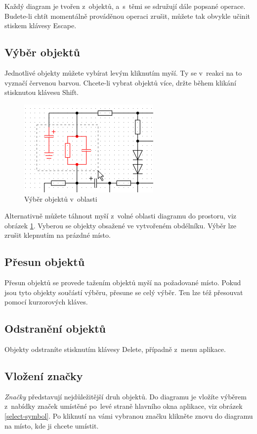 \documentclass[12pt,oneside,a4paper,titlepage,final]{article}
\theoremstyle{note}
\begin{document}
Každý diagram je tvořen z~objektů, a~s~těmi se sdružují dále popsané operace. Budete-li chtít momentálně prováděnou operaci zrušit, můžete tak obvykle učinit stiskem klávesy Escape.

\subsection{Výběr objektů}
Jednotlivé objekty můžete vybírat levým kliknutím myší. Ty se v~reakci na to vyznačí červenou barvou. Chcete-li vybrat objektů více, držte během klikání stisknutou klávesu Shift.

\begin{figure}[ht]
	\centering
	\includegraphics{select-objects}
	\caption{Výběr objektů v~oblasti}
	\label{select-objects}
\end{figure}

Alternativně můžete táhnout myší z~volné oblasti diagramu do prostoru, viz obrázek \ref{select-objects}. Vyberou se objekty obsažené ve vytvořeném obdélníku. Výběr lze zrušit klepnutím na prázdné místo.

\subsection{Přesun objektů}
Přesun objektů se provede tažením objektů myší na požadované místo. Pokud jsou tyto objekty součástí výběru, přesune se celý výběr. Ten lze též přesouvat pomocí kurzorových kláves.

\subsection{Odstranění objektů}
Objekty odstraníte stisknutím klávesy Delete, případně z~menu aplikace.

\subsection{Vložení značky}
\emph{Značky} představují nejdůležitější druh objektů. Do diagramu je vložíte výběrem z~nabídky značek umístěné po~levé straně hlavního okna aplikace, viz obrázek \ref{select-symbol}. Po kliknutí na vámi vybranou značku klikněte znovu do diagramu na místo, kde ji chcete umístit.
\end{document}

